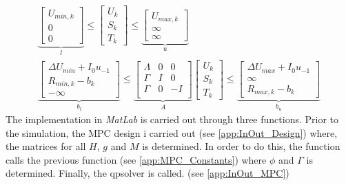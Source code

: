 \begin{equation}
    \begin{gathered}
        \underbrace{\begin{bmatrix}
            U_{min,k} \\ 0 \\ 0
        \end{bmatrix}}_l \leq
        \begin{bmatrix}
            U_k \\ S_k \\ T_k
        \end{bmatrix} \leq
        \underbrace{\begin{bmatrix}
            U_{max,k} \\ \infty \\ \infty
        \end{bmatrix}}_u \\
        \underbrace{\begin{bmatrix}
            \Delta U_{min}+I_0 u_{-1}\\ R_{min,k}-b_k \\ -\infty
        \end{bmatrix}}_{b_l} \leq
       \underbrace{\begin{bmatrix}
            \Lambda & 0 & 0\\
            \Gamma & I & 0\\
            \Gamma & 0 & -I\\
        \end{bmatrix}}_A
        \begin{bmatrix}
            U_k\\ S_k\\ T_k
        \end{bmatrix} \leq
        \underbrace{\begin{bmatrix}
            \Delta U_{max}+I_0 u_{-1}\\ \infty \\ R_{max,k}-b_k
        \end{bmatrix}}_{b_u}
    \end{gathered}
\end{equation}
The implementation in \textit{MatLab} is carried out through three functions. Prior to the simulation, the MPC design i carried out (see \cref{app:InOut_Design}) where, the matrices for all $H$, $g$ and $M$ is determined. In order to do this, the function calls the previous function (see \cref{app:MPC_Constants}) where $\phi$ and $\Gamma$ is determined. Finally, the qpsolver is called. (see \cref{app:InOut_MPC})